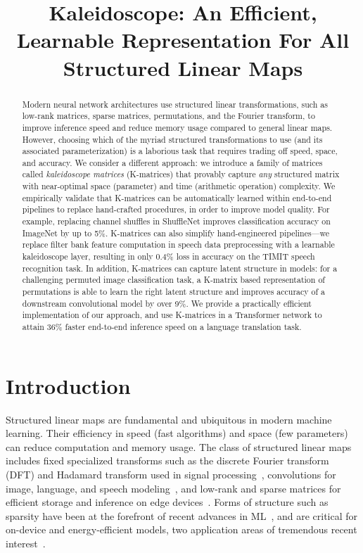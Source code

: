 \title{Kaleidoscope: An Efficient, Learnable Representation For All Structured Linear Maps}

\begin{abstract}
Modern neural network architectures use structured linear transformations, such as low-rank matrices, sparse matrices, permutations, and the Fourier transform, to improve inference speed and reduce memory usage compared to general linear maps. However, choosing which of the myriad structured transformations to use (and its associated parameterization) is a laborious task that requires trading off speed, space, and accuracy. We consider a different approach: we introduce a family of matrices called \emph{kaleidoscope matrices} (K-matrices) that provably capture \emph{any} structured matrix with near-optimal space (parameter) and time (arithmetic operation) complexity. We empirically validate that K-matrices can be automatically learned within end-to-end pipelines to replace hand-crafted procedures, in order to improve model quality. For example, replacing channel shuffles in ShuffleNet improves classification accuracy on ImageNet by up to 5\%.
K-matrices can also simplify hand-engineered pipelines---we replace filter bank feature computation in speech data preprocessing with a learnable kaleidoscope layer, resulting in only 0.4\% loss in accuracy on the TIMIT speech recognition task. In addition, K-matrices can capture latent structure in models: for a challenging permuted image classification task, a K-matrix based representation of permutations is able to learn the right latent structure and improves accuracy of a downstream convolutional model by over 9\%.
We provide a practically efficient implementation of our approach, and use K-matrices in a Transformer network to attain 36\% faster end-to-end inference speed on a language translation task.
\end{abstract}

\section{Introduction}
Structured linear maps are fundamental and ubiquitous in modern machine learning. Their efficiency in speed (fast algorithms) and space (few parameters) can reduce computation and memory usage. The class of structured linear maps includes fixed specialized transforms such as the discrete Fourier transform (DFT) and Hadamard transform used in signal processing~\citep{cooley1969fast}, convolutions for image, language, and speech modeling~\citep{gu2018recent}, and low-rank and sparse matrices for efficient storage and inference on edge devices~\citep{yu2017compressing}. Forms of structure such as sparsity have been at the forefront of recent advances in ML~\citep{frankle2019lottery}, and are critical for on-device and energy-efficient models, two application areas of tremendous recent interest~\citep{tsidulko2019google, schwartz2019green}.

